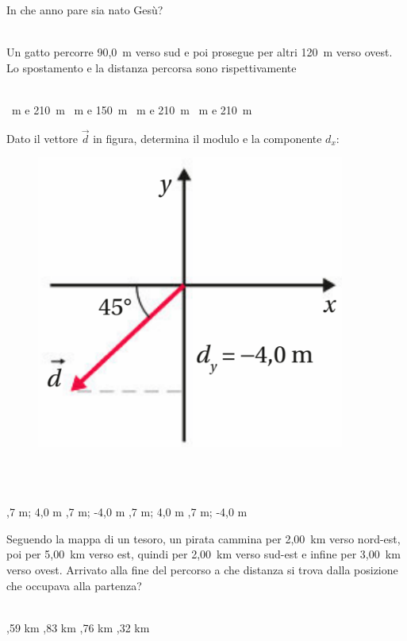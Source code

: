 \documentclass[a4paper,11pt]{exam}
\begin{document}
\begin{questions}
    
\question In che anno pare sia nato Gesù?\\\
\begin{oneparchoices}
\end{oneparchoices}

    
\question Un gatto percorre 90,0~m verso sud e poi prosegue per altri 120~m verso ovest. Lo spostamento e la distanza percorsa sono rispettivamente\\\
\begin{oneparchoices}
  \choice 30~m e 210~m
  ~m e 150~m
  \choice 210~m e 210~m
  ~m e 210~m
\end{oneparchoices}

    
\question Dato il vettore $\vec{d}$ in figura, determina il modulo e la componente $d_x$: \begin{figure}[h!]   \begin{center}     \includegraphics[scale=0.35]{vettored.png}   \end{center} \end{figure}\\\
\begin{oneparchoices}
  \choice 5,7 m; 4,0 m
  \choice 5,7 m; -4,0 m
  ,7 m; 4,0 m
  \choice -5,7 m; -4,0 m
\end{oneparchoices}

    
\question Seguendo la mappa di un tesoro, un pirata cammina per 2,00~km verso nord-est, poi per 5,00~km verso est, quindi per 2,00~km verso sud-est e infine per 3,00~km verso ovest. Arrivato alla fine del percorso a che distanza si trova dalla posizione che occupava alla partenza?\\\
\begin{oneparchoices}
  ,59 km
  ,83 km
  \choice 4,76 km
  \choice 6,32 km
\end{oneparchoices}


\end{questions}
\end{document}
